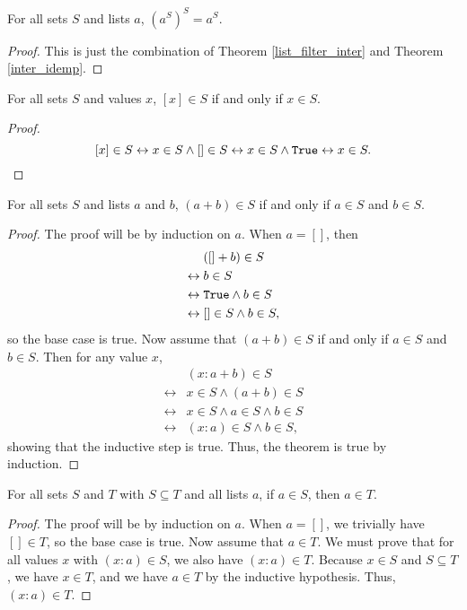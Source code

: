 \documentclass[../../math.tex]{subfiles}
\begin{document}
\begin{theorem} \label{list_filter_filter}
    For all sets $S$ and lists $a$, $(a^S)^S = a^S$.
\end{theorem}
\begin{proof}
    This is just the combination of Theorem \ref{list_filter_inter} and Theorem
    \ref{inter_idemp}.
\end{proof}

\begin{theorem}
    For all sets $S$ and values $x$, $[x] \in S$ if and only if $x \in S$.
\end{theorem}
\begin{proof}
    \[
        [x] \in S \leftrightarrow x \in S \wedge [] \in S
        \leftrightarrow x \in S \wedge \vtt{True}
        \leftrightarrow x \in S.
    \]
\end{proof}

\begin{theorem} \label{list_prop_conc}
    For all sets $S$ and lists $a$ and $b$, $(a + b) \in S$ if and only if $a
    \in S$ and $b \in S$.
\end{theorem}
\begin{proof}
    The proof will be by induction on $a$.  When $a = []$, then
    \begin{align*}
        &([] + b) \in S \\
        \leftrightarrow{}&b \in S \\
        \leftrightarrow{}&\vtt{True} \wedge b \in S \\
        \leftrightarrow{}&[] \in S \wedge b \in S,
    \end{align*}
    so the base case is true.  Now assume that $(a + b) \in S$ if and only if $a
    \in S$ and $b \in S$.  Then for any value $x$,
    \begin{align*}
        &(x : a + b) \in S \\
        \leftrightarrow{}&x \in S \wedge (a + b) \in S \\
        \leftrightarrow{}&x \in S \wedge a \in S \wedge b \in S \\
        \leftrightarrow{}&(x : a) \in S \wedge b \in S,
    \end{align*}
    showing that the inductive step is true.  Thus, the theorem is true by
    induction.
\end{proof}

\begin{theorem} \label{list_prop_sub}
    For all sets $S$ and $T$ with $S \subseteq T$ and all lists $a$, if $a \in
    S$, then $a \in T$.
\end{theorem}
\begin{proof}
    The proof will be by induction on $a$.  When $a = []$, we trivially have $[]
    \in T$, so the base case is true.  Now assume that $a \in T$.  We must prove
    that for all values $x$ with $(x : a) \in S$, we also have $(x : a) \in T$.
    Because $x \in S$ and $S \subseteq T$, we have $x \in T$, and we have $a \in
    T$ by the inductive hypothesis.  Thus, $(x : a) \in T$.
\end{proof}
\end{document}
